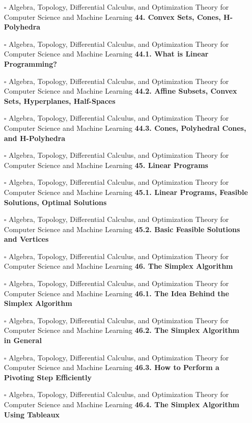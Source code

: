 \documentclass[a4, landscape, 12pt]{article}
\newcommand{\checkbox}{$\square$}%
\begin{document}
\begin{itemize}
{}
\item [\checkbox]  Algebra, Topology, Differential Calculus, and Optimization Theory for Computer Science and Machine Learning \textbf{ 44. Convex Sets, Cones, H-Polyhedra
}
\item [\checkbox]  Algebra, Topology, Differential Calculus, and Optimization Theory for Computer Science and Machine Learning \textbf{ 44.1. What is Linear Programming?
}
\item [\checkbox]  Algebra, Topology, Differential Calculus, and Optimization Theory for Computer Science and Machine Learning \textbf{ 44.2. Affine Subsets, Convex Sets, Hyperplanes, Half-Spaces
}
\item [\checkbox]  Algebra, Topology, Differential Calculus, and Optimization Theory for Computer Science and Machine Learning \textbf{ 44.3. Cones, Polyhedral Cones, and H-Polyhedra
}
\item [\checkbox]  Algebra, Topology, Differential Calculus, and Optimization Theory for Computer Science and Machine Learning \textbf{ 45. Linear Programs
}
\item [\checkbox]  Algebra, Topology, Differential Calculus, and Optimization Theory for Computer Science and Machine Learning \textbf{ 45.1. Linear Programs, Feasible Solutions, Optimal Solutions
}
\item [\checkbox]  Algebra, Topology, Differential Calculus, and Optimization Theory for Computer Science and Machine Learning \textbf{ 45.2. Basic Feasible Solutions and Vertices
}
\item [\checkbox]  Algebra, Topology, Differential Calculus, and Optimization Theory for Computer Science and Machine Learning \textbf{ 46. The Simplex Algorithm
}
\item [\checkbox]  Algebra, Topology, Differential Calculus, and Optimization Theory for Computer Science and Machine Learning \textbf{ 46.1. The Idea Behind the Simplex Algorithm
}
\item [\checkbox]  Algebra, Topology, Differential Calculus, and Optimization Theory for Computer Science and Machine Learning \textbf{ 46.2. The Simplex Algorithm in General
}
\item [\checkbox]  Algebra, Topology, Differential Calculus, and Optimization Theory for Computer Science and Machine Learning \textbf{ 46.3. How to Perform a Pivoting Step Efficiently
}
\item [\checkbox]  Algebra, Topology, Differential Calculus, and Optimization Theory for Computer Science and Machine Learning \textbf{ 46.4. The Simplex Algorithm Using Tableaux
}
\end{itemize}
\end{document}

